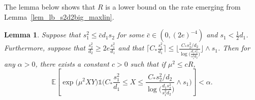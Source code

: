 \documentclass{article}
\newcommand{\EE}{\mathbb{E}}
\newcommand{\one}{\mathds{1}}
\newcommand{\Ct}{C_{*}}
\newtheorem{lemma}{Lemma}
\theoremstyle{remark}
\begin{document}
The lemma below shows that $R$ is a lower bound on the rate emerging from Lemma~\ref{lem_lb_s2d2big_maxlin}.

\begin{lemma}\label{lem_simplify_s2d2big_maxlin}
    Suppose that $s_1^2 \leq \bar{c}d_1s_2$ for some $\bar{c} \in (0, (2e)^{-4})$ and $s_1 < \frac12 d_1$. 
    Furthermore, suppose that $\frac{s^2_2}{d_2} \geq 2e\frac{s_1^2}{d_1}$ and that $\lceil \Ct \frac{s_1^2}{d_1}\rceil \leq \Big\lfloor \frac{\Ct s_2^2/d_2}{\log\big(\frac{d_1s_2^2}{s_1^2d_2}\big)}\Big\rfloor\wedge s_1$. Then for any $\alpha > 0$, there exists a constant $c > 0$ such that if $\mu^2 \leq cR$, 
    \[\EE\left[\exp\big(\mu^2XY\big)\one\bigg(\Ct \frac{s_1^2}{d_1}  \leq X \leq  \frac{\Ct s_2^2/d_2}{\log\big(\frac{d_1s_2^2}{s_1^2d_2}\big)}\wedge s_1\bigg)\right] < \alpha.\]
\end{lemma}
\end{document}
